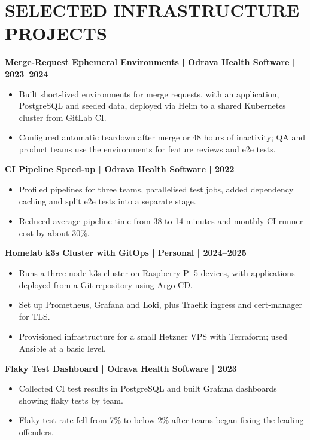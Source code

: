 \documentclass[11pt,a4paper]{article}
\begin{document}
\section*{SELECTED INFRASTRUCTURE PROJECTS}
\textbf{Merge-Request Ephemeral Environments | Odrava Health Software | 2023–2024}
\begin{itemize}
\item Built short-lived environments for merge requests, with an application, PostgreSQL and seeded data, deployed via Helm to a shared Kubernetes cluster from GitLab CI.
\item Configured automatic teardown after merge or 48 hours of inactivity; QA and product teams use the environments for feature reviews and e2e tests.
\end{itemize}
\textbf{CI Pipeline Speed-up | Odrava Health Software | 2022}
\begin{itemize}
\item Profiled pipelines for three teams, parallelised test jobs, added dependency caching and split e2e tests into a separate stage.
\item Reduced average pipeline time from 38 to 14 minutes and monthly CI runner cost by about 30\%.
\end{itemize}
\textbf{Homelab k3s Cluster with GitOps | Personal | 2024–2025}
\begin{itemize}
\item Runs a three-node k3s cluster on Raspberry Pi 5 devices, with applications deployed from a Git repository using Argo CD.
\item Set up Prometheus, Grafana and Loki, plus Traefik ingress and cert-manager for TLS.
\item Provisioned infrastructure for a small Hetzner VPS with Terraform; used Ansible at a basic level.
\end{itemize}
\textbf{Flaky Test Dashboard | Odrava Health Software | 2023}
\begin{itemize}
\item Collected CI test results in PostgreSQL and built Grafana dashboards showing flaky tests by team.
\item Flaky test rate fell from 7\% to below 2\% after teams began fixing the leading offenders.
\end{itemize}
\end{document}
